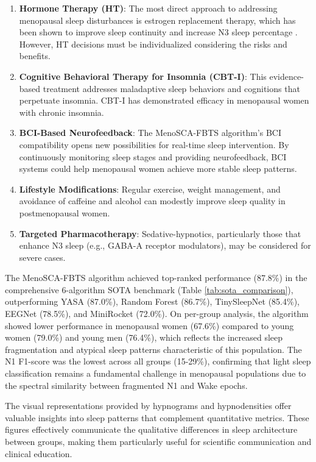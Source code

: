 \documentclass[a4paper,fleqn]{cas-dc}
\begin{document}
\begin{enumerate}
\item \textbf{Hormone Therapy (HT)}: The most direct approach to addressing menopausal sleep disturbances is estrogen replacement therapy, which has been shown to improve sleep continuity and increase N3 sleep percentage \cite{PoloKantola1998}. However, HT decisions must be individualized considering the risks and benefits.
\item \textbf{Cognitive Behavioral Therapy for Insomnia (CBT-I)}: This evidence-based treatment addresses maladaptive sleep behaviors and cognitions that perpetuate insomnia. CBT-I has demonstrated efficacy in menopausal women with chronic insomnia.
\item \textbf{BCI-Based Neurofeedback}: The MenoSCA-FBTS algorithm's BCI compatibility opens new possibilities for real-time sleep intervention. By continuously monitoring sleep stages and providing neurofeedback, BCI systems could help menopausal women achieve more stable sleep patterns.
\item \textbf{Lifestyle Modifications}: Regular exercise, weight management, and avoidance of caffeine and alcohol can modestly improve sleep quality in postmenopausal women.
\item \textbf{Targeted Pharmacotherapy}: Sedative-hypnotics, particularly those that enhance N3 sleep (e.g., GABA-A receptor modulators), may be considered for severe cases.
\end{enumerate}

The MenoSCA-FBTS algorithm achieved top-ranked performance (87.8\%) in the comprehensive 6-algorithm SOTA benchmark (Table \ref{tab:sota_comparison}), outperforming YASA (87.0\%), Random Forest (86.7\%), TinySleepNet (85.4\%), EEGNet (78.5\%), and MiniRocket (72.0\%). On per-group analysis, the algorithm showed lower performance in menopausal women (67.6\%) compared to young women (79.0\%) and young men (76.4\%), which reflects the increased sleep fragmentation and atypical sleep patterns characteristic of this population. The N1 F1-score was the lowest across all groups (15-29\%), confirming that light sleep classification remains a fundamental challenge in menopausal populations due to the spectral similarity between fragmented N1 and Wake epochs.

The visual representations provided by hypnograms and hypnodensities offer valuable insights into sleep patterns that complement quantitative metrics. These figures effectively communicate the qualitative differences in sleep architecture between groups, making them particularly useful for scientific communication and clinical education.
\end{document}
